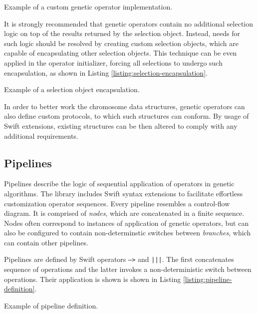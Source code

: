 \begin{listing}[ht]
	\caption{Example of a custom genetic operator implementation.}
	\label{listing:custom-operator}
\end{listing}

It is strongly recommended that genetic operators contain no additional selection logic on top of the results returned by the selection object. Instead, needs for such logic should be resolved by creating custom selection objects, which are capable of encapsulating other selection objects. This technique can be even applied in the operator initializer, forcing all selections to undergo such encapsulation, as shown in Listing \ref{listing:selection-encapsulation}.

\begin{listing}[ht]
	\caption{Example of a selection object encapsulation.}
	\label{listing:selection-encapsulation}
\end{listing}

In order to better work the chromosome data structures, genetic operators can also define custom protocols, to which such structures can conform. By usage of Swift extensions, existing structures can be then altered to comply with any additional requirements.

\subsection{Pipelines}\label{section:pipelines}
Pipelines describe the logic of sequential application of operators in genetic algorithms. The library includes Swift syntax extensions to facilitate effortless customization operator sequences. Every pipeline resembles a control-flow diagram. It is comprised of \textit{nodes}, which are concatenated in a finite sequence. Nodes often correspond to instances of application of genetic operators, but can also be configured to contain non-determinstic switches between \textit{branches}, which can contain other pipelines.

Pipelines are defined by Swift operators \texttt{--->} and \texttt{|||}. The first concatenates sequence of operations and the latter invokes a non-deterministic switch between operations. Their application is shown is shown in Listing \ref{listing:pipeline-definition}.

\begin{listing}[ht]
	\caption{Example of pipeline definition.}
	\label{listing:pipeline-definition}
\end{listing}

